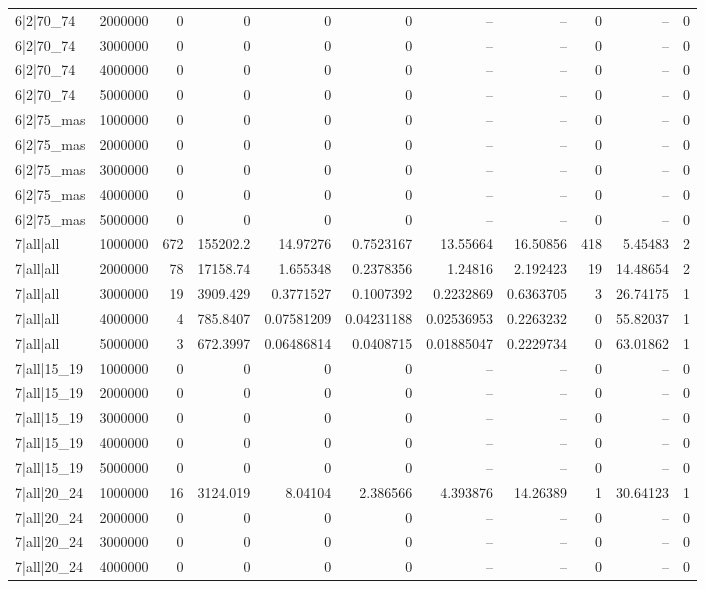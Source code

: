 \begin{tabular}{lrrrrrrrrrr}
6|2|70\_74 & 2000000 & 0 & 0 & 0 & 0 & -- & -- & 0 & -- & 0 \\
6|2|70\_74 & 3000000 & 0 & 0 & 0 & 0 & -- & -- & 0 & -- & 0 \\
6|2|70\_74 & 4000000 & 0 & 0 & 0 & 0 & -- & -- & 0 & -- & 0 \\
6|2|70\_74 & 5000000 & 0 & 0 & 0 & 0 & -- & -- & 0 & -- & 0 \\
6|2|75\_mas & 1000000 & 0 & 0 & 0 & 0 & -- & -- & 0 & -- & 0 \\
6|2|75\_mas & 2000000 & 0 & 0 & 0 & 0 & -- & -- & 0 & -- & 0 \\
6|2|75\_mas & 3000000 & 0 & 0 & 0 & 0 & -- & -- & 0 & -- & 0 \\
6|2|75\_mas & 4000000 & 0 & 0 & 0 & 0 & -- & -- & 0 & -- & 0 \\
6|2|75\_mas & 5000000 & 0 & 0 & 0 & 0 & -- & -- & 0 & -- & 0 \\
7|all|all & 1000000 & 672 & 155202.2 & 14.97276 & 0.7523167 & 13.55664 & 16.50856 & 418 & 5.45483 & 2 \\
7|all|all & 2000000 & 78 & 17158.74 & 1.655348 & 0.2378356 & 1.24816 & 2.192423 & 19 & 14.48654 & 2 \\
7|all|all & 3000000 & 19 & 3909.429 & 0.3771527 & 0.1007392 & 0.2232869 & 0.6363705 & 3 & 26.74175 & 1 \\
7|all|all & 4000000 & 4 & 785.8407 & 0.07581209 & 0.04231188 & 0.02536953 & 0.2263232 & 0 & 55.82037 & 1 \\
7|all|all & 5000000 & 3 & 672.3997 & 0.06486814 & 0.0408715 & 0.01885047 & 0.2229734 & 0 & 63.01862 & 1 \\
7|all|15\_19 & 1000000 & 0 & 0 & 0 & 0 & -- & -- & 0 & -- & 0 \\
7|all|15\_19 & 2000000 & 0 & 0 & 0 & 0 & -- & -- & 0 & -- & 0 \\
7|all|15\_19 & 3000000 & 0 & 0 & 0 & 0 & -- & -- & 0 & -- & 0 \\
7|all|15\_19 & 4000000 & 0 & 0 & 0 & 0 & -- & -- & 0 & -- & 0 \\
7|all|15\_19 & 5000000 & 0 & 0 & 0 & 0 & -- & -- & 0 & -- & 0 \\
7|all|20\_24 & 1000000 & 16 & 3124.019 & 8.04104 & 2.386566 & 4.393876 & 14.26389 & 1 & 30.64123 & 1 \\
7|all|20\_24 & 2000000 & 0 & 0 & 0 & 0 & -- & -- & 0 & -- & 0 \\
7|all|20\_24 & 3000000 & 0 & 0 & 0 & 0 & -- & -- & 0 & -- & 0 \\
7|all|20\_24 & 4000000 & 0 & 0 & 0 & 0 & -- & -- & 0 & -- & 0 \\

\end{tabular}

